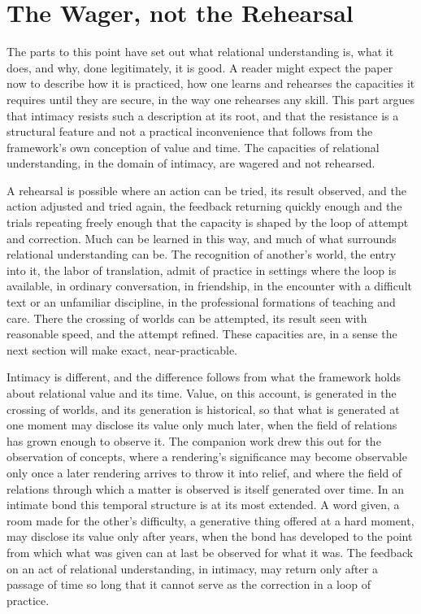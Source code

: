 \section{The Wager, not the Rehearsal}
\label{p27:sec:wager}

\noindent
The parts to this point have set out what relational understanding is, what it does, and why, done legitimately, it is good. A reader might expect the paper now to describe how it is practiced, how one learns and rehearses the capacities it requires until they are secure, in the way one rehearses any skill. This part argues that intimacy resists such a description at its root, and that the resistance is a structural feature and not a practical inconvenience that follows from the framework's own conception of value and time. The capacities of relational understanding, in the domain of intimacy, are wagered and not rehearsed.

A rehearsal is possible where an action can be tried, its result observed, and the action adjusted and tried again, the feedback returning quickly enough and the trials repeating freely enough that the capacity is shaped by the loop of attempt and correction. Much can be learned in this way, and much of what surrounds relational understanding can be. The recognition of another's world, the entry into it, the labor of translation, admit of practice in settings where the loop is available, in ordinary conversation, in friendship, in the encounter with a difficult text or an unfamiliar discipline, in the professional formations of teaching and care. There the crossing of worlds can be attempted, its result seen with reasonable speed, and the attempt refined. These capacities are, in a sense the next section will make exact, near-practicable.

Intimacy is different, and the difference follows from what the framework holds about relational value and its time. Value, on this account, is generated in the crossing of worlds, and its generation is historical, so that what is generated at one moment may disclose its value only much later, when the field of relations has grown enough to observe it. The companion work drew this out for the observation of concepts, where a rendering's significance may become observable only once a later rendering arrives to throw it into relief, and where the field of relations through which a matter is observed is itself generated over time. In an intimate bond this temporal structure is at its most extended. A word given, a room made for the other's difficulty, a generative thing offered at a hard moment, may disclose its value only after years, when the bond has developed to the point from which what was given can at last be observed for what it was. The feedback on an act of relational understanding, in intimacy, may return only after a passage of time so long that it cannot serve as the correction in a loop of practice.

